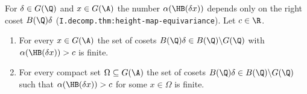 For $\delta\in G(\Q)$ and $x\in G(\A)$ the number $\alpha(\HB(\delta x))$ depends only on the right coset $B(\Q)\delta$
(\texttt{I.decomp.thm:height-map-equivariance}). Let $c\in\R$.
\begin{enumerate}
  \item[(a)] For every $x\in G(\A)$ the set of cosets $B(\Q)\delta\in B(\Q)\backslash G(\Q)$ with $\alpha(\HB(\delta x))>c$ is finite.
  \item[(b)] For every compact set $\Omega\subseteq G(\A)$ the set of cosets $B(\Q)\delta\in B(\Q)\backslash G(\Q)$ such that
  $\alpha(\HB(\delta x))>c$ for some $x\in\Omega$ is finite.
\end{enumerate}
